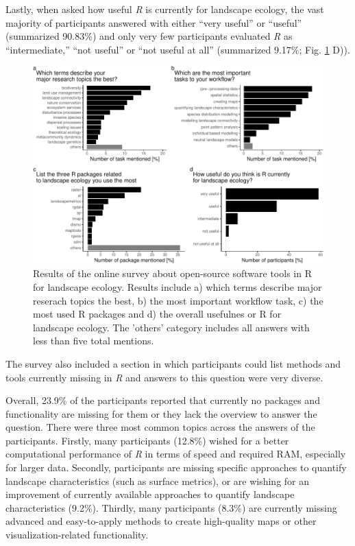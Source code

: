 \documentclass[smallextended]{svjour3}       %
\begin{document}
Lastly, when asked how useful \emph{R} is currently for landscape ecology, the vast majority of participants answered with either ``very useful'' or ``useful'' (summarized 90.83\%) and only very few participants evaluated \emph{R} as ``intermediate,'' ``not useful'' or ``not useful at all'' (summarized 9.17\%; Fig. \ref{fig:fig-survey} D)).

\begin{figure}

{\centering \includegraphics[width=1\linewidth]{paper_files/figure-latex/fig-survey-1} 

}

\caption{Results of the online survey about open-source software tools in R for landscape ecology. Results include a) which terms describe major reserach topics the best, b) the most important workflow task, c) the most used R packages and d) the overall usefulnes or R for landscape ecology. The 'others' category includes all answers with less than five total mentions.}\label{fig:fig-survey}
\end{figure}

The survey also included a section in which participants could list methods and tools currently missing in \emph{R} and answers to this question were very diverse.

Overall, 23.9\% of the participants reported that currently no packages and functionality are missing for them or they lack the overview to answer the question.
There were three most common topics across the answers of the participants.
Firstly, many participants (12.8\%) wished for a better computational performance of \emph{R} in terms of speed and required RAM, especially for larger data.
Secondly, participants are missing specific approaches to quantify landscape characteristics (such as surface metrics), or are wishing for an improvement of currently available approaches to quantify landscape characteristics (9.2\%).
Thirdly, many participants (8.3\%) are currently missing advanced and easy-to-apply methods to create high-quality maps or other visualization-related functionality.
\end{document}
